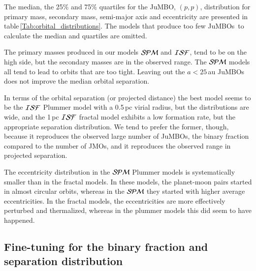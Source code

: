 \documentclass[submission,phys]{lib/SciPost}
\newcommand{\jumbo}{\mbox{JuMBO}}
\newcommand{\jumbos}{\mbox{JuMBOs}}
\begin{document}
The median, the 25\% and 75\% quartiles for the \jumbo, $(p,p)$,
distribution for primary mass, secondary mass, semi-major axis and
eccentricity are presented in table\,\ref{Tab:orbital_distributions}.
The models that produce too few \jumbos\, to calculate the median and
quartiles are omitted.

The primary masses produced in our models ${\cal SPM}$ and ${\cal
  ISF}$, tend to be on the high side, but the secondary masses are in
the observed range.  The ${\cal SPM}$ models all tend to lead to
orbits that are too tight. Leaving out the $a<25$\,au \jumbos\, does
not improve the median orbital separation.

In terms of the orbital separation (or projected distance) the best
model seems to be the ${\cal ISF}$ Plummer model with a 0.5\,pc virial
radius, but the distributions are wide, and the 1\,pc ${\cal ISF}$
fractal model exhibits a low formation rate, but the appropriate
separation distribution.  We tend to prefer the former, though,
because it reproduces the observed large number of \jumbos, the binary
fraction compared to the number of JMOs, and it reproduces the
observed range in projected separation.

The eccentricity distribution in the ${\cal SPM}$ Plummer models is
systematically smaller than in the fractal models.  In these
models, the planet-moon pairs started in almost circular orbits,
whereas in the ${\cal SPM}$ they started with higher average
eccentricities.  In the fractal models, the eccentricities are more
effectively perturbed and thermalized, whereas in the plummer models
this did seem to have happened.

\subsection{Fine-tuning for the binary fraction and separation distribution}
\end{document}
